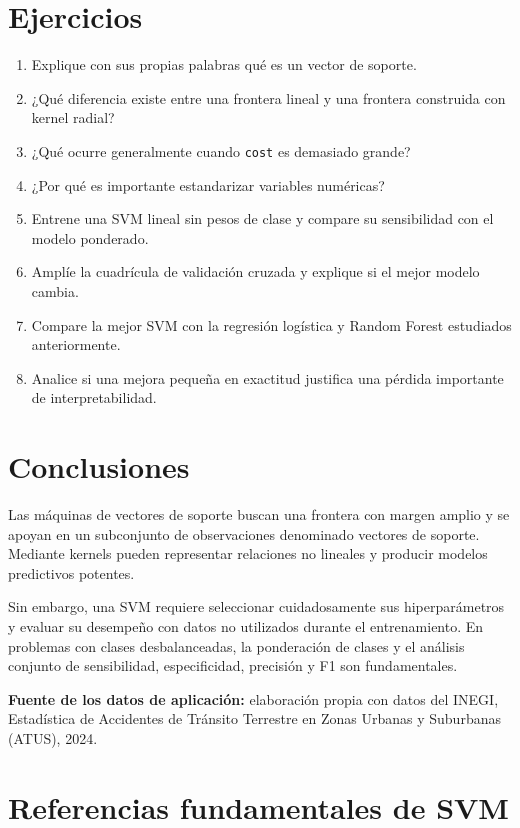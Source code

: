 \documentclass[
  spanish,
  10.5pt,
  letterpaper,
  openany,
  headings=big]{scrbook}
\providecommand{\tightlist}{%
  \setlength{\itemsep}{0pt}\setlength{\parskip}{0pt}}
\begin{document}
\section{Ejercicios}\label{ejercicios}

\begin{enumerate}
\def\labelenumi{\arabic{enumi}.}
\tightlist
\item
  Explique con sus propias palabras qué es un vector de soporte.
\item
  ¿Qué diferencia existe entre una frontera lineal y una frontera
  construida con kernel radial?
\item
  ¿Qué ocurre generalmente cuando \texttt{cost} es demasiado grande?
\item
  ¿Por qué es importante estandarizar variables numéricas?
\item
  Entrene una SVM lineal sin pesos de clase y compare su sensibilidad
  con el modelo ponderado.
\item
  Amplíe la cuadrícula de validación cruzada y explique si el mejor
  modelo cambia.
\item
  Compare la mejor SVM con la regresión logística y Random Forest
  estudiados anteriormente.
\item
  Analice si una mejora pequeña en exactitud justifica una pérdida
  importante de interpretabilidad.
\end{enumerate}

\section{Conclusiones}\label{conclusiones-1}

Las máquinas de vectores de soporte buscan una frontera con margen
amplio y se apoyan en un subconjunto de observaciones denominado
vectores de soporte. Mediante kernels pueden representar relaciones no
lineales y producir modelos predictivos potentes.

Sin embargo, una SVM requiere seleccionar cuidadosamente sus
hiperparámetros y evaluar su desempeño con datos no utilizados durante
el entrenamiento. En problemas con clases desbalanceadas, la ponderación
de clases y el análisis conjunto de sensibilidad, especificidad,
precisión y F1 son fundamentales.

\textbf{Fuente de los datos de aplicación:} elaboración propia con datos
del INEGI, Estadística de Accidentes de Tránsito Terrestre en Zonas
Urbanas y Suburbanas (ATUS), 2024.

\section{Referencias fundamentales de
SVM}\label{referencias-fundamentales-de-svm}
\end{document}
